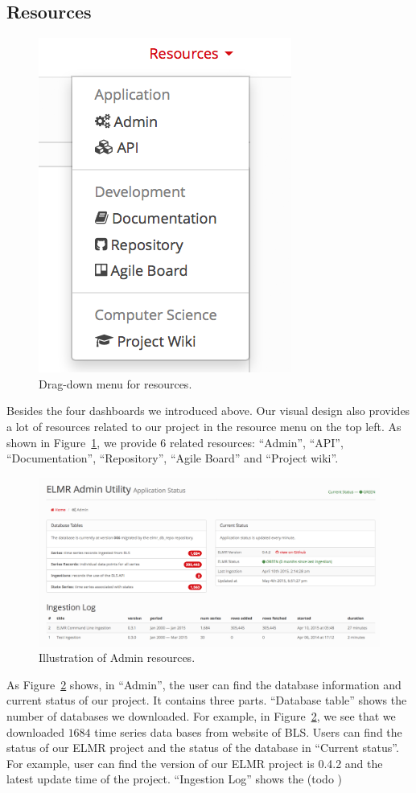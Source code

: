 \documentclass{sigchi}
\begin{document}
\subsection{Resources}
\begin{figure}
\centering
\includegraphics[scale=0.8]{figures/resource.png}
\caption{Drag-down menu for resources.}
\label{fig:resource}
\end{figure}
Besides the four dashboards we introduced above. Our visual design also provides a lot of resources related to our project in the resource menu on the top left. As shown in Figure~\ref{fig:resource}, we provide $6$ related resources: ``Admin'', ``API'', ``Documentation'', ``Repository'', ``Agile Board'' and ``Project wiki''.

\begin{figure}
\centering
\includegraphics[scale = 0.5]{figures/Admin.png}
\caption{Illustration of Admin resources.}
\label{fig:admin}
\end{figure}
As Figure~\ref{fig:admin} shows, in ``Admin'', the user can find the database information and current status of our project. It contains three parts. ``Database table'' shows the number of databases we downloaded. For example,  in Figure~\ref{fig:admin}, we see that we downloaded $1684$ time series data bases from website of BLS\cite{Labor_data}. Users can find the status of our ELMR project and the status of the database in ``Current status''. For example, user can find the version of our ELMR project is 0.4.2 and the latest update time of the project. ``Ingestion Log'' shows the (todo )
\end{document}
